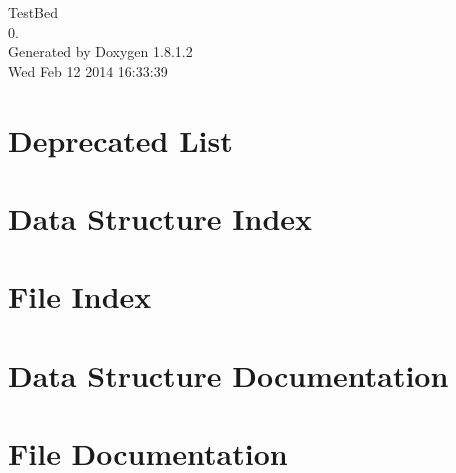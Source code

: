 \documentclass{book}
\begin{document}
\hypersetup{pageanchor=false,citecolor=blue}
\begin{titlepage}
\vspace*{7cm}
\begin{center}
{\Large Test\-Bed \\[1ex]\large 0. }\\
\vspace*{1cm}
{\large Generated by Doxygen 1.8.1.2}\\
\vspace*{0.5cm}
{\small Wed Feb 12 2014 16:33:39}\\
\end{center}
\end{titlepage}
\clearemptydoublepage
{}
\tableofcontents
\clearemptydoublepage
{}
\hypersetup{pageanchor=true,citecolor=blue}
\chapter{Deprecated List}
\label{deprecated}
\hypertarget{deprecated}{}

\chapter{Data Structure Index}

\chapter{File Index}

\chapter{Data Structure Documentation}
















\chapter{File Documentation}
































\printindex
\end{document}
